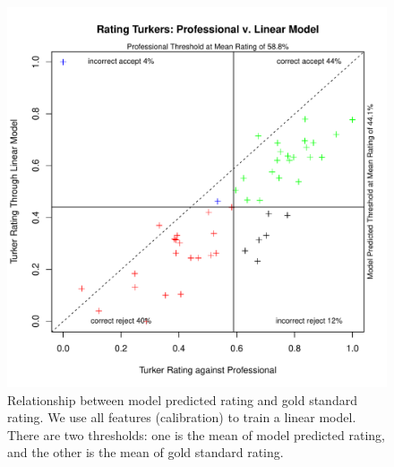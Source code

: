 \documentclass[11pt]{article}
\begin{document}
\begin{figure}[htbp]
  \centering
  \includegraphics[width=\linewidth]{AllFeatureWithCali/rrankingallfeaturewithcalilm2.pdf}
  \caption{Relationship between model predicted rating and gold standard rating. We use all features (calibration) to train a linear model. There are two thresholds: one is the mean of model predicted rating, and the other is the mean of gold standard rating.}
    \label{flmallcalirrating2}
\end{figure}
\end{document}
